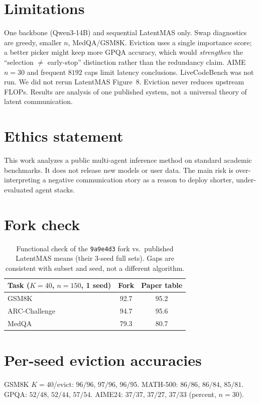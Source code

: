 \documentclass[11pt]{article}
\begin{document}
\section*{Limitations}
One backbone (Qwen3-14B) and sequential LatentMAS only. Swap diagnostics
are greedy, smaller $n$, MedQA/GSM8K. Eviction uses a single importance
score; a better picker might keep more GPQA accuracy, which would
\emph{strengthen} the ``selection $\neq$ early-stop'' distinction rather
than the redundancy claim. AIME $n{=}30$ and frequent $8192$ caps limit
latency conclusions. LiveCodeBench was not run. We did not rerun
LatentMAS Figure~8. Eviction never reduces upstream FLOPs. Results are
analysis of one published system, not a universal theory of latent
communication.

\section*{Ethics statement}
This work analyzes a public multi-agent inference method on standard
academic benchmarks. It does not release new models or user data. The
main risk is over-interpreting a negative communication story as a
reason to deploy shorter, under-evaluated agent stacks.



\appendix

\section{Fork check}
\label{app:fork}
\begin{table}[h]
\centering
\small
\begin{tabular}{lcc}
\toprule
Task ($K{=}40$, $n{=}150$, 1 seed) & Fork & Paper table \\
\midrule
GSM8K & 92.7 & 95.2 \\
ARC-Challenge & 94.7 & 95.6 \\
MedQA & 79.3 & 80.7 \\
\bottomrule
\end{tabular}
\caption{Functional check of the \texttt{9a9e4d3} fork vs.\ published
LatentMAS means (their 3-seed full sets). Gaps are consistent with
subset and seed, not a different algorithm.}
\end{table}

\section{Per-seed eviction accuracies}
\label{app:seeds}
GSM8K $K{=}40$/evict: $96/96$, $97/96$, $96/95$.
MATH-500: $86/86$, $86/84$, $85/81$.
GPQA: $52/48$, $52/44$, $57/54$.
AIME24: $37/37$, $37/27$, $37/33$ (percent, $n{=}30$).
\end{document}
